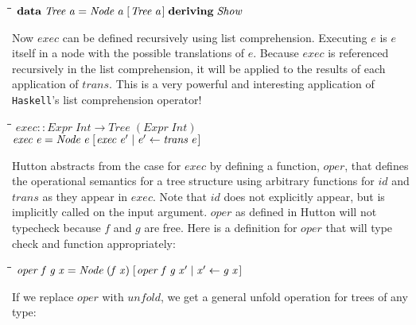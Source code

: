 \documentclass[10pt]{article}
\newlength{\lwidth}\setlength{\lwidth}{4.5cm}
\newlength{\cwidth}\setlength{\cwidth}{8mm} %
\newcommand{\Conid}[1]{\mathit{#1}}
\newcommand{\Varid}[1]{\mathit{#1}}
\begin{document}
\begin{tabbing}
\qquad\=\hspace{\lwidth}\=\hspace{\cwidth}\=\+\kill
${\mathbf{data}\;\Conid{Tree}\;\Varid{a}\mathrel{=}\Conid{Node}\;\Varid{a}\;[\mskip1.5mu \Conid{Tree}\;\Varid{a}\mskip1.5mu]\;\mathbf{deriving}\;\Conid{Show}}$
\end{tabbing}
Now \ensuremath{\Varid{exec}} can be defined recursively using list comprehension.
Executing \ensuremath{\Varid{e}} is \ensuremath{\Varid{e}} itself in a node with the possible translations
of \ensuremath{\Varid{e}}.  Because \ensuremath{\Varid{exec}} is referenced recursively in the list
comprehension, it will be applied to the results of each application
of \ensuremath{\Varid{trans}}.  This is a very powerful and interesting application of
\texttt{Haskell}'s list comprehension operator!

\begin{tabbing}
\qquad\=\hspace{\lwidth}\=\hspace{\cwidth}\=\+\kill
${\Varid{exec}\mathbin{::}\Conid{Expr}\;\Conid{Int}\to \Conid{Tree}\;(\Conid{Expr}\;\Conid{Int})}$\\
${\Varid{exec}\;\Varid{e}\mathrel{=}\Conid{Node}\;\Varid{e}\;[\mskip1.5mu \Varid{exec}\;\Varid{e'}\mid \Varid{e'}\leftarrow \Varid{trans}\;\Varid{e}\mskip1.5mu]}$
\end{tabbing}
Hutton abstracts from the case for \ensuremath{\Varid{exec}} by defining a function,
\ensuremath{\Varid{oper}}, that defines the operational semantics for a tree structure
using arbitrary functions for \ensuremath{\Varid{id}} and \ensuremath{\Varid{trans}} as they appear in
\ensuremath{\Varid{exec}}.  Note that \ensuremath{\Varid{id}} does not explicitly appear, but is implicitly
called on the input argument.  \ensuremath{\Varid{oper}} as defined in Hutton will not
typecheck because \ensuremath{\Varid{f}} and \ensuremath{\Varid{g}} are free.  Here is a definition for
\ensuremath{\Varid{oper}} that will type check and function appropriately:

\begin{tabbing}
\qquad\=\hspace{\lwidth}\=\hspace{\cwidth}\=\+\kill
${\Varid{oper}\;\Varid{f}\;\Varid{g}\;\Varid{x}\mathrel{=}\Conid{Node}\;(\Varid{f}\;\Varid{x})\;[\mskip1.5mu \Varid{oper}\;\Varid{f}\;\Varid{g}\;\Varid{x'}\mid \Varid{x'}\leftarrow \Varid{g}\;\Varid{x}\mskip1.5mu]}$
\end{tabbing}
If we replace \ensuremath{\Varid{oper}} with \ensuremath{\Varid{unfold}}, we get a general unfold operation for
trees of any type:
\end{document}
